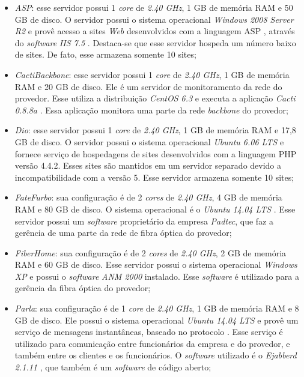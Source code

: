 \begin{itemize}
 \item \textit{ASP}: esse servidor possui 1 \textit{core} de \textit{2.40 GHz}, 1 GB de memória \ac{RAM} e 50 GB de disco. 
 O servidor possui o sistema operacional \textit{Windows 2008 Server R2} e provê acesso a sites \textit{Web} desenvolvidos com a linguagem 
 \ac{ASP} \cite{asp}, através do \textit{software} \textit{\ac{IIS} 7.5} \cite{iis}. Destaca-se que esse servidor hospeda um número baixo de sites.
 De fato, esse armazena somente 10 sites;
 
 \item \textit{CactiBackbone}: esse servidor possui 1 \textit{core} de \textit{2.40 GHz}, 1 GB de memória \ac{RAM} e 20 GB de disco. 
 Ele é um servidor de monitoramento da rede do provedor. Esse utiliza a distribuição \textit{CentOS 6.3} \cite{centos} e executa a aplicação 
 \textit{Cacti 0.8.8a} \cite{cacti}. Essa aplicação monitora uma parte da rede \textit{backbone} do provedor;
 
 \item \textit{Dio}: esse servidor possui 1 \textit{core} de \textit{2.40 GHz}, 1 GB de memória \ac{RAM} e 17,8 GB de disco. 
 O servidor possui o sistema operacional \textit{Ubuntu 6.06 \ac{LTS}} \cite{ubuntu} e fornece serviço de hospedagens de sites desenvolvidos com 
 a linguagem \ac{PHP} versão 4.4.2. Esses sites são mantidos em um servidor separado devido a incompatibilidade com a versão 5. Esse servidor 
 armazena somente 10 sites;
 
 \item \textit{FateFurbo}: sua configuração é de 2 \textit{cores} de \textit{2.40 GHz}, 4 GB de memória \ac{RAM} e 80 GB de disco. 
 O sistema operacional é o \textit{Ubuntu 14.04 \ac{LTS}} \cite{ubuntu}. Esse servidor possui um \textit{software} proprietário da empresa 
 \textit{Padtec}, que faz a gerência de uma parte da rede de fibra óptica do provedor;
 
 \item \textit{FiberHome}: sua configuração é de 2 \textit{cores} de \textit{2.40 GHz}, 2 GB de memória \ac{RAM} e 60 GB de disco. 
 Esse servidor possui o sistema operacional \textit{Windows XP} e possui o \textit{software} \textit{ANM 2000} instalado. Esse \textit{software} 
 é utilizado para a gerência da fibra óptica do provedor;
 
 \item \textit{Parla}: sua configuração é de 1 \textit{core} de \textit{2.40 GHz}, 1 GB de memória \ac{RAM} e 8 GB de disco. 
 Ele possui o sistema operacional \textit{Ubuntu 14.04 \ac{LTS}} \cite{ubuntu} e provê um serviço de mensagens instantâneas, baseado no protocolo 
  \cite{xmpp}. Esse serviço é utilizado para comunicação entre funcionários da empresa e do provedor, e também entre os clientes e 
 os funcionários. O \textit{software} utilizado é o \textit{Ejabberd 2.1.11} \cite{ejabberd}, que também é um \textit{software} de código aberto;


\end{itemize}

